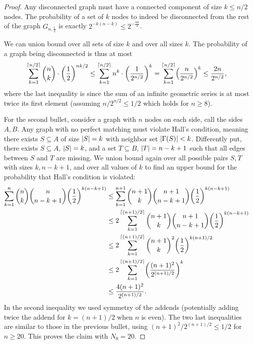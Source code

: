 \documentclass[letter,11pt]{article}
\begin{document}
\begin{proof}
    Any disconnected graph must have a connected component of size $k \leq n/2$ nodes. 
    The probability of a set of $k$ nodes to indeed be disconnected from the rest of the graph $G_{n,\frac{1}{2}}$ is exactly $2^{-k(n-k)} \leq 2^{-\frac{nk}{2}}$.

    We can union bound over all sets of size $k$ and over all sizes $k$. The probability of a graph being disconnected is thus at most
    \[
        \sum_{k=1}^{\ceil{n/2}} \binom{n}{k} \cdot \left(\frac{1}{2}\right)^{nk/2}
        \leq \sum_{k=1}^{\ceil{n/2}} n^k \cdot \left(\frac{1}{2^{n/2}}\right)^{k}
        = \sum_{k=1}^{\ceil{n/2}} \left(\frac{n}{2^{n/2}}\right)^k 
        \leq \frac{2n}{2^{n/2}} ,
    \]
    where the last inequality is since the sum of an infinite geometric series is at most twice its first element (assuming $n/2^{n/2} \leq 1/2$ which holds for $n\geq 8$).

    For the second bullet, consider a graph with $n$ nodes on each side, call the sides $A, B$. 
    Any graph with no perfect matching must violate Hall's condition, meaning there exists $S \subseteq A$ of size $\card{S} = k$ with neighbor set $\card{\Gamma(S)} < k$.
    Differently put, there exists $S\subseteq A$, $\card{S} = k$, and a set $T\subseteq B$, $\card{T} = n-k+1$ such that all edges between $S$ and $T$ are missing.
    We union bound again over all possible pairs $S, T$ with sizes $k, n-k+1$, and over all values of $k$ to find an upper bound for the probability that Hall's condition is violated:
\[    \begin{aligned}
        \sum_{k=1}^{n}\binom{n}{k} \binom{n}{n-k+1} \left(\frac{1}{2}\right)^{k(n-k+1)}
        &\leq \sum_{k=1}^{n+1}\binom{n+1}{k} \binom{n+1}{n-k+1} \left(\frac{1}{2}\right)^{k(n-k+1)}\\
        &\leq 2\sum_{k=1}^{\ceil{(n+1)/2}}\binom{n+1}{k} \binom{n+1}{n-k+1} \left(\frac{1}{2}\right)^{k(n-k+1)}\\
        &\leq 2\sum_{k=1}^{\ceil{(n+1)/2}}\binom{n+1}{k}^2 \left(\frac{1}{2}\right)^{k(n+1)/2}\\
        &\leq 2\sum_{k=1}^{\ceil{(n+1)/2}} \left(\frac{(n+1)^2}{2^{(n+1)/2}}\right)^k\\
        &\leq \frac{4 (n+1)^2}{2^{(n+1)/2}} .
    \end{aligned}
    \]
    In the second inequality we used symmetry of the addends (potentially adding twice the addend for $k=(n+1)/2$ when $n$ is even). The two last inequalities are similar to those in the previous bullet, using $(n+1)^2/2^{(n+1)/2} \leq 1/2$ for $n \geq 20$. This proves the claim with $N_0 = 20$.
\end{proof}
\end{document}
